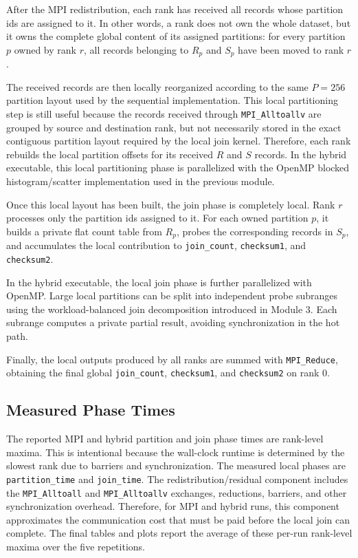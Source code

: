 \documentclass[11pt,a4paper]{article}
\begin{document}
After the MPI redistribution, each rank has received all records whose partition ids are assigned to it. In other words, a rank does not own the whole dataset, but it owns the complete global content of its assigned partitions: for every partition \(p\) owned by rank \(r\), all records belonging to \(R_p\) and \(S_p\) have been moved to rank \(r\).

The received records are then locally reorganized according to the same \(P=256\) partition layout used by the sequential implementation. This local partitioning step is still useful because the records received through \texttt{MPI\_Alltoallv} are grouped by source and destination rank, but not necessarily stored in the exact contiguous partition layout required by the local join kernel. Therefore, each rank rebuilds the local partition offsets for its received \(R\) and \(S\) records. In the hybrid executable, this local partitioning phase is parallelized with the OpenMP blocked histogram/scatter implementation used in the previous module.

Once this local layout has been built, the join phase is completely local. Rank \(r\) processes only the partition ids assigned to it. For each owned partition \(p\), it builds a private flat count table from \(R_p\), probes the corresponding records in \(S_p\), and accumulates the local contribution to \texttt{join\_count}, \texttt{checksum1}, and \texttt{checksum2}.

In the hybrid executable, the local join phase is further parallelized with OpenMP. Large local partitions can be split into independent probe subranges using the workload-balanced join decomposition introduced in Module 3. Each subrange computes a private partial result, avoiding synchronization in the hot path.

Finally, the local outputs produced by all ranks are summed with \texttt{MPI\_Reduce}, obtaining the final global \texttt{join\_count}, \texttt{checksum1}, and \texttt{checksum2} on rank 0.

\subsection{Measured Phase Times}

The reported MPI and hybrid partition and join phase times are rank-level maxima.  This is intentional because the wall-clock runtime is determined by the slowest rank due to barriers and synchronization.  The measured local phases are \texttt{partition\_time} and \texttt{join\_time}.  The redistribution/residual component includes the \texttt{MPI\_Alltoall} and \texttt{MPI\_Alltoallv} exchanges, reductions, barriers, and other synchronization overhead.  Therefore, for MPI and hybrid runs, this component approximates the communication cost that must be paid before the local join can complete. The final tables and plots report the average of these per-run rank-level maxima over the five repetitions.
\end{document}
